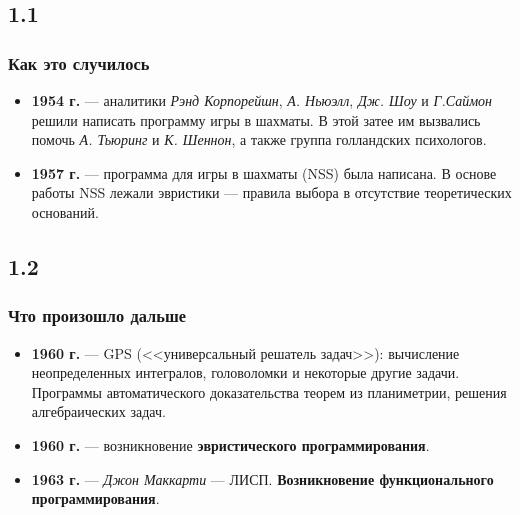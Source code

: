 \documentclass[default]{beamer}
\begin{document}
	\subsection{1.1}
	\begin{frame}
		\frametitle{Как это случилось}

		\begin{itemize}
			\item \textbf{1954 г.} --- аналитики \textit{Рэнд Корпорейшн}, \textit{А. Ньюэлл}, \textit{Дж. Шоу} и \textit{Г.Саймон}  решили написать программу игры в шахматы. В этой затее им вызвались помочь \textit{А. Тьюринг} и \textit{К. Шеннон}, а также группа голландских психологов.
			\item \textbf{1957 г.} --- программа для игры в шахматы (NSS) была написана. В основе работы NSS лежали эвристики --- правила выбора в отсутствие теоретических оснований.
		\end{itemize}
	\end{frame}
	\subsection{1.2}
	\begin{frame}
	\frametitle{Что произошло дальше}
	
		\begin{itemize}
			\item \textbf{1960 г.}  --- GPS (<<универсальный решатель задач>>): вычисление неопределенных интегралов, головоломки и  некоторые другие задачи.  Программы автоматического доказательства теорем из планиметрии, решения алгебраических задач. 
			\item \textbf{1960 г.} --- возникновение \textbf{эвристического программирования}. 
			\item \textbf{1963 г.} --- \textit{Джон Маккарти} --- ЛИСП. \textbf{Возникновение функционального программирования}.
		\end{itemize}
	\end{frame}
\end{document}
